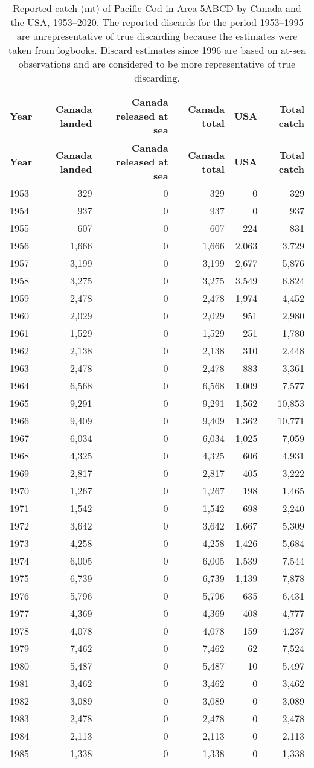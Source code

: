 \documentclass[11pt]{book}
\begin{document}
\begin{longtable}[]{@{}lrrrrr@{}}
\caption{\label{tab:tab-catch-5abcd}Reported catch (mt) of Pacific Cod in Area 5ABCD by Canada and the USA, 1953--2020. The reported discards for the period 1953--1995 are unrepresentative of true discarding because the estimates were taken from logbooks. Discard estimates since 1996 are based on at-sea observations and are considered to be more representative of true discarding.}\tabularnewline
\toprule
\textbf{Year} & \textbf{Canada landed} & \textbf{Canada released at sea} & \textbf{Canada total} & \textbf{USA} & \textbf{Total catch}\tabularnewline
\midrule
\endfirsthead
\toprule
\textbf{Year} & \textbf{Canada landed} & \textbf{Canada released at sea} & \textbf{Canada total} & \textbf{USA} & \textbf{Total catch}\tabularnewline
\midrule
\endhead
1953 & 329 & 0 & 329 & 0 & 329\tabularnewline
1954 & 937 & 0 & 937 & 0 & 937\tabularnewline
1955 & 607 & 0 & 607 & 224 & 831\tabularnewline
1956 & 1,666 & 0 & 1,666 & 2,063 & 3,729\tabularnewline
1957 & 3,199 & 0 & 3,199 & 2,677 & 5,876\tabularnewline
1958 & 3,275 & 0 & 3,275 & 3,549 & 6,824\tabularnewline
1959 & 2,478 & 0 & 2,478 & 1,974 & 4,452\tabularnewline
1960 & 2,029 & 0 & 2,029 & 951 & 2,980\tabularnewline
1961 & 1,529 & 0 & 1,529 & 251 & 1,780\tabularnewline
1962 & 2,138 & 0 & 2,138 & 310 & 2,448\tabularnewline
1963 & 2,478 & 0 & 2,478 & 883 & 3,361\tabularnewline
1964 & 6,568 & 0 & 6,568 & 1,009 & 7,577\tabularnewline
1965 & 9,291 & 0 & 9,291 & 1,562 & 10,853\tabularnewline
1966 & 9,409 & 0 & 9,409 & 1,362 & 10,771\tabularnewline
1967 & 6,034 & 0 & 6,034 & 1,025 & 7,059\tabularnewline
1968 & 4,325 & 0 & 4,325 & 606 & 4,931\tabularnewline
1969 & 2,817 & 0 & 2,817 & 405 & 3,222\tabularnewline
1970 & 1,267 & 0 & 1,267 & 198 & 1,465\tabularnewline
1971 & 1,542 & 0 & 1,542 & 698 & 2,240\tabularnewline
1972 & 3,642 & 0 & 3,642 & 1,667 & 5,309\tabularnewline
1973 & 4,258 & 0 & 4,258 & 1,426 & 5,684\tabularnewline
1974 & 6,005 & 0 & 6,005 & 1,539 & 7,544\tabularnewline
1975 & 6,739 & 0 & 6,739 & 1,139 & 7,878\tabularnewline
1976 & 5,796 & 0 & 5,796 & 635 & 6,431\tabularnewline
1977 & 4,369 & 0 & 4,369 & 408 & 4,777\tabularnewline
1978 & 4,078 & 0 & 4,078 & 159 & 4,237\tabularnewline
1979 & 7,462 & 0 & 7,462 & 62 & 7,524\tabularnewline
1980 & 5,487 & 0 & 5,487 & 10 & 5,497\tabularnewline
1981 & 3,462 & 0 & 3,462 & 0 & 3,462\tabularnewline
1982 & 3,089 & 0 & 3,089 & 0 & 3,089\tabularnewline
1983 & 2,478 & 0 & 2,478 & 0 & 2,478\tabularnewline
1984 & 2,113 & 0 & 2,113 & 0 & 2,113\tabularnewline
1985 & 1,338 & 0 & 1,338 & 0 & 1,338\tabularnewline

\end{longtable}
\end{document}
